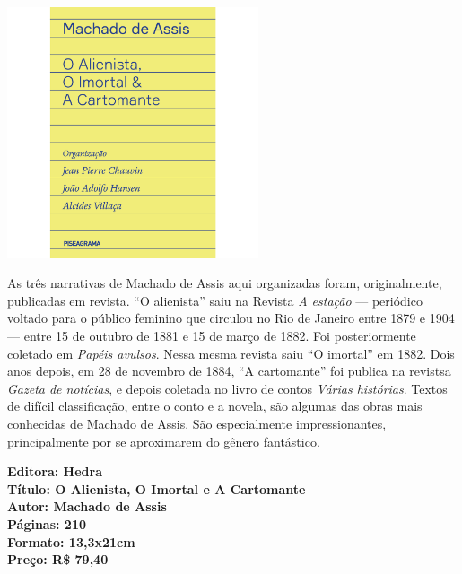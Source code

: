 \pagebreak

\begin{center}
\hspace*{-3.6cm}
\hspace*{3.1cm}\includegraphics[width=74mm]{./grid/alienista.png}
\end{center}

\hspace*{-7cm}\hrulefill\hspace*{-7cm}

\medskip

\noindent{}As três narrativas de Machado de Assis aqui organizadas foram, originalmente,
publicadas em revista. ``O alienista'' saiu na Revista \textit{A estação} --- periódico voltado para o público feminino que circulou no Rio de Janeiro entre 1879 e 1904 --- entre 15 de outubro de 1881 e 15 de março de 1882. Foi posteriormente coletado em \textit{Papéis avulsos}. Nessa mesma revista saiu ``O imortal'' em 1882. Dois anos depois, em 28 de novembro de 1884, ``A cartomante'' foi publica na revistsa \textit{Gazeta de notícias}, e depois coletada no livro de contos \textit{Várias histórias}. Textos de difícil classificação, entre o conto e a novela, são algumas das obras mais conhecidas de Machado de Assis. São especialmente impressionantes, principalmente por se aproximarem do gênero fantástico.

\vfill

\noindent\begin{minipage}[c]{1\linewidth}
{\small\textbf{
\hspace*{-.1cm}Editora: Hedra\\
Título: O Alienista, O Imortal e A Cartomante\\
Autor: Machado de Assis\\ 
Páginas: 210\\
Formato: 13,3x21cm\\
Preço: R\$ 79,40\\
}}
\end{minipage}

